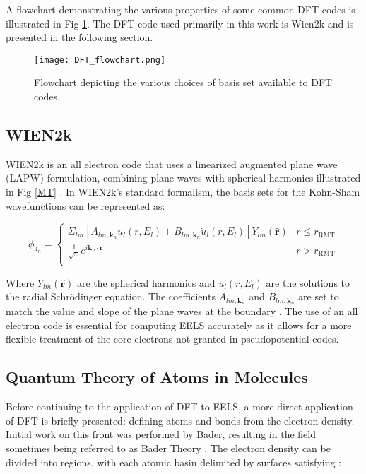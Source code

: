  A flowchart demonstrating the various properties of some common DFT codes is illustrated in Fig \ref{dft-flowchart}.  The DFT code used primarily in this work is Wien2k and is presented in the following section.

\begin{figure}
	\centering
	\texttt{[image: DFT\_flowchart.png]}
	\caption{Flowchart depicting the various choices of basis set available to DFT codes.}
	\label{dft-flowchart}
\end{figure}


\subsection{WIEN2k}
WIEN2k is an all electron code that uses a linearized augmented plane wave (LAPW) formulation, combining plane waves with spherical harmonics illustrated in Fig \ref{MT} \cite{wien2k}.   In WIEN2k's standard formalism, the basis sets for the Kohn-Sham wavefunctions can be represented as: 

\begin{equation}
	\phi_{\mathrm{k}_n} = 
	\begin{cases}
	\Sigma_{lm} [A_{lm,\textbf{k}_n}u_l(r,E_l) + B_{lm,\textbf{k}_n}\dot{u}_l(r,E_l)]Y_{lm}(\hat{\textbf{r}}) & r \leq r_{\mathrm{RMT}} \\
	\frac{1}{\sqrt{\omega}}e^{i\textbf{k}_n \cdot \textbf{r}} & r> r_{\mathrm{RMT}} \\
	\end{cases}
\end{equation}

Where $Y_{lm}(\hat{\textbf{r}})$ are the spherical harmonics and $u_l(r,E_l)$ are the solutions to the radial Schr\"odinger equation.  The coefficients $A_{lm,\textbf{k}_n}$ and $B_{lm,\textbf{k}_n}$ are set to match the value and slope of the plane waves at the boundary \cite{wien2k}.  The use of an all electron code is essential for computing EELS accurately as it allows for a more flexible treatment of the core electrons not granted in pseudopotential codes. 
 


\subsection{Quantum Theory of Atoms in Molecules} \label{bader-theory}
Before continuing to the application of DFT to EELS,  a more direct application of DFT is briefly presented: defining atoms and bonds from the electron density. Initial work on this front was performed by Bader, resulting in the field sometimes being referred to as Bader Theory \cite{bader}. The electron density can be divided into regions, with each atomic basin  delimited by surfaces satisfying \cite{bader_quantum_1991}: 


